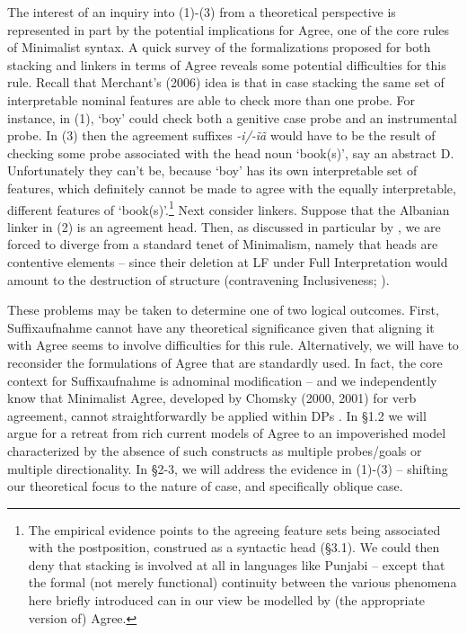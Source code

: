 \documentclass[output=paper]{langsci/langscibook}
\begin{document}
\begin{styleSfondomedioiColorexxi}
The interest of an inquiry into (1)-(3) from a theoretical perspective is represented in part by the potential implications for Agree, one of the core rules of Minimalist syntax. A quick survey of the formalizations proposed for both stacking and linkers in terms of Agree reveals some potential difficulties for this rule. Recall that Merchant’s (2006) idea is that in case stacking the same set of interpretable nominal features are able to check more than one probe. For instance, in (1), ‘boy’ could check both a genitive case probe and an instrumental probe. In (3) then the agreement suffixes \textit{{}-}\textit{i/-ĩã} would have to be the result of checking some probe associated with the head noun ‘book(s)’, say an abstract D. Unfortunately they can’t be, because ‘boy’ has its own interpretable set of features, which definitely cannot be made to agree with the equally interpretable, different features of ‘book(s)’.\footnote{The empirical evidence points to the agreeing feature sets being associated with the postposition, construed as a syntactic head (§3.1). We could then deny that stacking is involved at all in languages like Punjabi – except that the formal (not merely functional) continuity between the various phenomena here briefly introduced can in our view be modelled by (the appropriate version of) Agree.} Next consider linkers. Suppose that the Albanian linker in (2) is an agreement head. Then, as discussed in particular by \citet{Philip2012}, we are forced to diverge from a standard tenet of Minimalism, namely that heads are contentive elements – since their deletion at LF under Full Interpretation would amount to the destruction of structure (contravening Inclusiveness; \citealt{Chomsky1995}). 
\end{styleSfondomedioiColorexxi}

\begin{styleSfondomedioiColorexxi}
These problems may be taken to determine one of two logical outcomes. First, Suffixaufnahme cannot have any theoretical significance given that aligning it with Agree seems to involve difficulties for this rule. Alternatively, we will have to reconsider the formulations of Agree that are standardly used. In fact, the core context for Suffixaufnahme is adnominal modification – and we independently know that Minimalist Agree, developed by Chomsky (2000, 2001) for verb agreement, cannot straightforwardly be applied within DPs \citep{Carstens2001}. In §1.2 we will argue for a retreat from rich current models of Agree to an impoverished model characterized by the absence of such constructs as multiple probes/goals or multiple directionality. In §2-3, we will address the evidence in (1)-(3) – shifting our theoretical focus to the nature of case, and specifically oblique case.
\end{styleSfondomedioiColorexxi}
\end{document}
